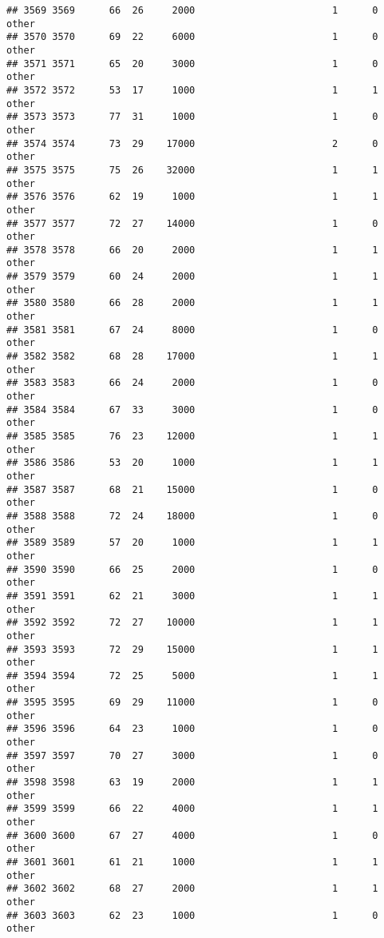\documentclass[
]{article}
\begin{document}
\begin{verbatim}
## 3569 3569      66  26     2000                        1      0    other
## 3570 3570      69  22     6000                        1      0    other
## 3571 3571      65  20     3000                        1      0    other
## 3572 3572      53  17     1000                        1      1    other
## 3573 3573      77  31     1000                        1      0    other
## 3574 3574      73  29    17000                        2      0    other
## 3575 3575      75  26    32000                        1      1    other
## 3576 3576      62  19     1000                        1      1    other
## 3577 3577      72  27    14000                        1      0    other
## 3578 3578      66  20     2000                        1      1    other
## 3579 3579      60  24     2000                        1      1    other
## 3580 3580      66  28     2000                        1      1    other
## 3581 3581      67  24     8000                        1      0    other
## 3582 3582      68  28    17000                        1      1    other
## 3583 3583      66  24     2000                        1      0    other
## 3584 3584      67  33     3000                        1      0    other
## 3585 3585      76  23    12000                        1      1    other
## 3586 3586      53  20     1000                        1      1    other
## 3587 3587      68  21    15000                        1      0    other
## 3588 3588      72  24    18000                        1      0    other
## 3589 3589      57  20     1000                        1      1    other
## 3590 3590      66  25     2000                        1      0    other
## 3591 3591      62  21     3000                        1      1    other
## 3592 3592      72  27    10000                        1      1    other
## 3593 3593      72  29    15000                        1      1    other
## 3594 3594      72  25     5000                        1      1    other
## 3595 3595      69  29    11000                        1      0    other
## 3596 3596      64  23     1000                        1      0    other
## 3597 3597      70  27     3000                        1      0    other
## 3598 3598      63  19     2000                        1      1    other
## 3599 3599      66  22     4000                        1      1    other
## 3600 3600      67  27     4000                        1      0    other
## 3601 3601      61  21     1000                        1      1    other
## 3602 3602      68  27     2000                        1      1    other
## 3603 3603      62  23     1000                        1      0    other

\end{verbatim}
\end{document}
